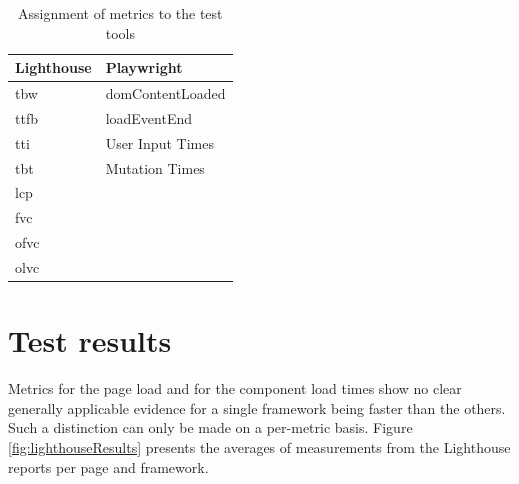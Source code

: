 \documentclass[a4paper, 12pt]{article}
\begin{document}
\begin{table}[h]
  \begin{center}
    \begin{tabular}{|l|l|}
      \hline
      \textbf{Lighthouse} & \textbf{Playwright} \\ \hline
      \acrfull{tbw}       & domContentLoaded    \\ \hline
      \acrfull{ttfb}      & loadEventEnd        \\ \hline
      \acrfull{tti}       & User Input Times    \\ \hline
      \acrfull{tbt}       & Mutation Times      \\ \hline
      \acrfull{lcp}       &                     \\ \hline
      \acrfull{fvc}       &                     \\ \hline
      \acrfull{ofvc}      &                     \\ \hline
      \acrfull{olvc}      &                     \\ \hline
    \end{tabular}
  \end{center}
  \caption{Assignment of metrics to the test tools}
  \label{tab:metricassignment}
\end{table}

\section{Test results}

Metrics for the page load and for the component load times show no clear generally applicable evidence for a single framework being faster than the others.
Such a distinction can only be made on a per-metric basis.
Figure \ref{fig:lighthouseResults} presents the averages of measurements from the Lighthouse reports per page and framework.
\\
\end{document}
